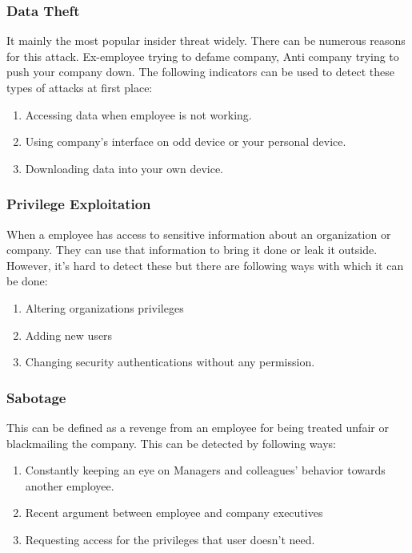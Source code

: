 \documentclass{ijitcs}
\begin{document}
\subsubsection{Data Theft}
It mainly the most popular insider threat
widely. There can be numerous reasons for this attack.
Ex-employee trying to defame company, Anti company trying
to push your company down. The following indicators can be
used to detect these types of attacks at first place:
\begin{enumerate}
\item   Accessing data when employee is not working.
\item   Using company’s interface on odd device or your personal device.
\item   Downloading data into your own device.\cite{singh2022systematic}
\end{enumerate}
\subsubsection{Privilege Exploitation}
When a employee has access to
sensitive information about an organization or company. They
can use that information to bring it done or leak it outside.
However, it’s hard to detect these but there are following
ways with which it can be done:
\begin{enumerate}
    \item Altering organizations privileges
    \item Adding new users
    \item Changing security authentications without any permission.\cite{singh2022systematic}
\end{enumerate}
\subsubsection{Sabotage}
This can be defined as a revenge from
an employee for being treated unfair or blackmailing the
company. This can be detected by following ways:
\begin{enumerate}
    \item   Constantly keeping an eye on Managers and colleagues’ behavior towards another employee.
    \item    Recent argument between employee and company executives
    \item     Requesting access for the privileges that user doesn’t need.\cite{singh2022systematic}
\end{enumerate}
\end{document}
